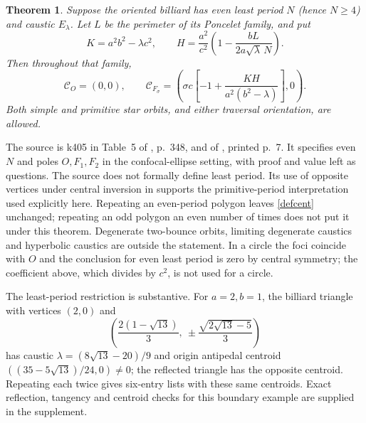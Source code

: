 \documentclass[11pt]{article}
\newtheorem{theorem}{Theorem}
\newcommand{\Cent}{\mathcal C}
\begin{document}
\begin{samepage}
\begin{theorem}\label{main}
Suppose the oriented billiard has even least period $N$ (hence $N\ge4$)
and caustic $E_\lambda$. Let $L$ be the perimeter of its Poncelet family,
and put
\[
 K=a^2b^2-\lambda c^2,\qquad
 H=\frac{a^2}{c^2}\left(1-\frac{bL}{2a\sqrt\lambda\,N}\right).
\]
Then throughout that family,
\begin{equation}\label{answer}
 \Cent_O=(0,0),\qquad
 \Cent_{F_\sigma}=
 \left(\sigma c\left[-1+\frac{KH}{a^2(b^2-\lambda)}\right],0\right).
\end{equation}
Both simple and primitive star orbits, and either traversal orientation,
are allowed.
\end{theorem}
\end{samepage}

The source is k405 in Table~5 of \cite{RGK21}, p.~348, and of
\cite{RGK20}, printed p.~7. It specifies even $N$ and poles $O,F_1,F_2$
in the confocal-ellipse setting, with proof and value left as questions.
The source does not formally define least period. Its use of opposite
vertices under central inversion in \cite[Section~3.7]{RGK20} supports
the primitive-period interpretation used explicitly here. Repeating an
even-period polygon leaves \eqref{defcent} unchanged; repeating an odd
polygon an even number of times does not put it under this theorem.
Degenerate two-bounce orbits, limiting degenerate caustics and hyperbolic
caustics are outside the statement. In a circle the foci coincide with
$O$ and the conclusion for even least period is zero by central symmetry;
the coefficient above, which divides by $c^2$, is not used for a circle.

The least-period restriction is substantive. For $a=2,b=1$, the
billiard triangle with vertices $(2,0)$ and
\[
 \left(\frac{2(1-\sqrt{13})}{3},
       \ \pm\frac{\sqrt{2\sqrt{13}-5}}{3}\right)
\]
has caustic $\lambda=(8\sqrt{13}-20)/9$ and origin antipedal centroid
$((35-5\sqrt{13})/24,0)\ne0$; the reflected triangle has the opposite
centroid. Repeating each twice gives six-entry lists with these same
centroids. Exact reflection, tangency and centroid checks for this
boundary example are supplied in the supplement.
\end{document}
